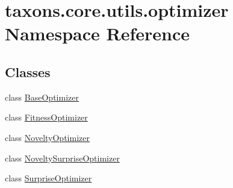 \hypertarget{namespacetaxons_1_1core_1_1utils_1_1optimizer}{}\section{taxons.\+core.\+utils.\+optimizer Namespace Reference}
\label{namespacetaxons_1_1core_1_1utils_1_1optimizer}
\subsection*{Classes}
\begin{DoxyCompactItemize}
\item 
class \hyperlink{classtaxons_1_1core_1_1utils_1_1optimizer_1_1_base_optimizer}{Base\+Optimizer}
\item 
class \hyperlink{classtaxons_1_1core_1_1utils_1_1optimizer_1_1_fitness_optimizer}{Fitness\+Optimizer}
\item 
class \hyperlink{classtaxons_1_1core_1_1utils_1_1optimizer_1_1_novelty_optimizer}{Novelty\+Optimizer}
\item 
class \hyperlink{classtaxons_1_1core_1_1utils_1_1optimizer_1_1_novelty_surprise_optimizer}{Novelty\+Surprise\+Optimizer}
\item 
class \hyperlink{classtaxons_1_1core_1_1utils_1_1optimizer_1_1_surprise_optimizer}{Surprise\+Optimizer}
\end{DoxyCompactItemize}
